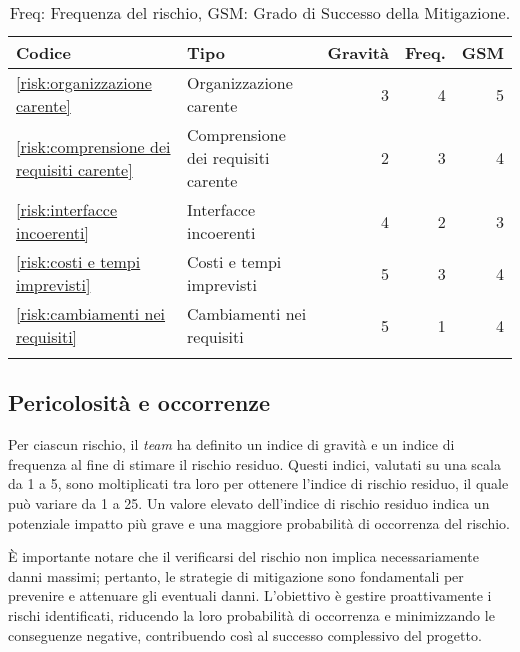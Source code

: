 \begin{table}[H]
	\centering
	\begin{tabular}{l|l|r|r|r}
		\hline
		\textbf{Codice}                                                          & \textbf{Tipo} & \textbf{Gravità} & \textbf{Freq.} & \textbf{GSM} \\
		\hline
		\autoref{risk:organizzazione carente} 					&Organizzazione carente                         & 3                & 4                  & 5                      \\
		\autoref{risk:comprensione dei requisiti carente} 		&Comprensione dei requisiti carente & 2                & 3                  & 4                        \\
		\autoref{risk:interfacce incoerenti} 					&Interfacce incoerenti                           & 4                & 2                  & 3                        \\
		\autoref{risk:costi e tempi imprevisti} 				&Costi e tempi imprevisti                     & 5                & 3                  & 4                      \\
		\autoref{risk:cambiamenti nei requisiti} 				&Cambiamenti nei requisiti                   & 5                & 1                  & 4                       \\
		\hline
		\multicolumn{5}{l}{}                                                                                                                                    \\
	\end{tabular}
	\caption{Freq: Frequenza del rischio, GSM: Grado di Successo della Mitigazione.}
\end{table}







\subsection{Pericolosità e occorrenze}
Per ciascun rischio, il \textit{team} ha definito un indice di gravità e 
un indice di frequenza al fine di stimare il rischio residuo. 
Questi indici, valutati su una scala da 1 a 5, sono moltiplicati tra loro 
per ottenere l'indice di rischio residuo, il quale può variare da 1 a 25. 
Un valore elevato dell'indice di rischio residuo indica un potenziale impatto 
più grave e una maggiore probabilità di occorrenza del rischio.

È importante notare che il verificarsi del rischio non implica necessariamente
 danni massimi; pertanto, le strategie di mitigazione sono fondamentali per 
 prevenire e attenuare gli eventuali danni. 
 L'obiettivo è gestire proattivamente i rischi identificati, riducendo la loro 
 probabilità di occorrenza e minimizzando le conseguenze negative, contribuendo 
 così al successo complessivo del progetto.



